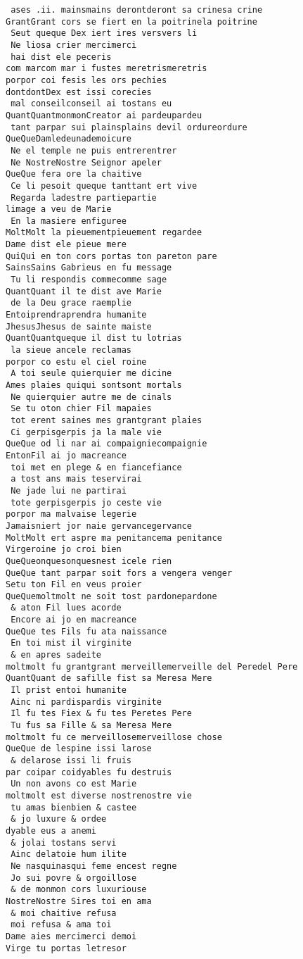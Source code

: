 \documentclass[
  letterpaper,
  DIV=11,
  numbers=noendperiod]{scrreprt}
\begin{document}
\begin{verbatim}
 ases .ii. mainsmains derontderont sa crinesa crine
GrantGrant cors se fiert en la poitrinela poitrine
 Seut queque Dex iert ires versvers li
 Ne liosa crier mercimerci
 hai dist ele peceris
com marcom mar i fustes meretrismeretris
porpor coi fesis les ors pechies
dontdontDex est issi corecies
 mal conseilconseil ai tostans eu
QuantQuantmonmonCreator ai pardeupardeu
 tant parpar sui plainsplains devil ordureordure
QueQueDamledeunademoicure
 Ne el temple ne puis entrerentrer
 Ne NostreNostre Seignor apeler
QueQue fera ore la chaitive
 Ce li pesoit queque tanttant ert vive
 Regarda ladestre partiepartie
limage a veu de Marie
 En la masiere enfiguree
MoltMolt la pieuementpieuement regardee
Dame dist ele pieue mere
QuiQui en ton cors portas ton pareton pare
SainsSains Gabrieus en fu message
 Tu li respondis commecomme sage
QuantQuant il te dist ave Marie
 de la Deu grace raemplie
Entoiprendraprendra humanite
JhesusJhesus de sainte maiste
QuantQuantqueque il dist tu lotrias
 la sieue ancele reclamas
porpor co estu el ciel roine
 A toi seule quierquier me dicine
Ames plaies quiqui sontsont mortals 
 Ne quierquier autre me de cinals
 Se tu oton chier Fil mapaies
 tot erent saines mes grantgrant plaies
 Ci gerpisgerpis ja la male vie
QueQue od li nar ai compaigniecompaignie
EntonFil ai jo macreance
 toi met en plege & en fiancefiance
 a tost ans mais teservirai
 Ne jade lui ne partirai
 tote gerpisgerpis jo ceste vie
porpor ma malvaise legerie
Jamaisniert jor naie gervancegervance
MoltMolt ert aspre ma penitancema penitance
Virgeroine jo croi bien
QueQueonquesonquesnest icele rien
QueQue tant parpar soit fors a vengera venger
Setu ton Fil en veus proier
QueQuemoltmolt ne soit tost pardonepardone
 & aton Fil lues acorde
 Encore ai jo en macreance
QueQue tes Fils fu ata naissance
 En toi mist il virginite
 & en apres sadeite
moltmolt fu grantgrant merveillemerveille del Peredel Pere
QuantQuant de safille fist sa Meresa Mere
 Il prist entoi humanite
 Ainc ni pardispardis virginite
 Il fu tes Fiex & fu tes Peretes Pere
 Tu fus sa Fille & sa Meresa Mere
moltmolt fu ce merveillosemerveillose chose
QueQue de lespine issi larose
 & delarose issi li fruis
par coipar coidyables fu destruis
 Un non avons co est Marie
moltmolt est diverse nostrenostre vie
 tu amas bienbien & castee
 & jo luxure & ordee
dyable eus a anemi
 & jolai tostans servi
 Ainc delatoie hum ilite
 Ne nasquinasqui feme encest regne
 Jo sui povre & orgoillose
 & de monmon cors luxuriouse
NostreNostre Sires toi en ama
 & moi chaitive refusa
 moi refusa & ama toi
Dame aies mercimerci demoi
Virge tu portas letresor

\end{verbatim}
\end{document}
